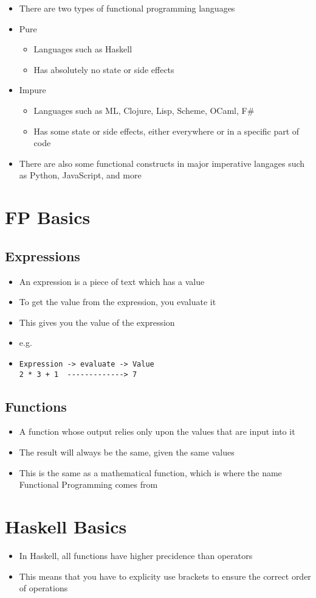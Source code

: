 \begin{itemize}
  \item There are two types of functional programming languages
  \item Pure
  \begin{itemize}
    \item Languages such as Haskell
    \item Has absolutely no state or side effects
  \end{itemize}
  \item Impure
  \begin{itemize}
    \item Languages such as ML, Clojure, Lisp, Scheme, OCaml, F\#
    \item Has some state or side effects, either everywhere or in a specific part of code
  \end{itemize}
  \item There are also some functional constructs in major imperative langages such as Python, JavaScript, and more
\end{itemize}

\section*{FP Basics}

\subsection*{Expressions}

\begin{itemize}
  \item An expression is a piece of text which has a value
  \item To get the value from the expression, you evaluate it
  \item This gives you the value of the expression
  \item e.g.
  \item \begin{verbatim}
Expression -> evaluate -> Value
2 * 3 + 1  -------------> 7
  \end{verbatim}
\end{itemize}

\subsection*{Functions}

\begin{itemize}
  \item A function whose output relies only upon the values that are input into it
  \item The result will always be the same, given the same values
  \item This is the same as a mathematical function, which is where the name Functional Programming comes from
\end{itemize}

\section*{Haskell Basics}

\begin{itemize}
  \item In Haskell, all functions have higher precidence than operators
  \item This means that you have to explicity use brackets to ensure the correct order of operations
\end{itemize}